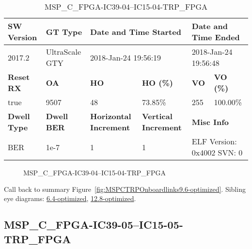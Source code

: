 \begin{table}[h]
\centering
\caption{MSP\_C\_FPGA-IC39-04--IC15-04-TRP\_FPGA}
\label{tab:MSPCFPGAIC3904IC1504TRPFPGA9.6-optimized}
\begin{tabular}{@{}|l|l|l|l|l|l|@{}}
\toprule
\textbf{SW Version}                & \textbf{GT Type}   & \multicolumn{2}{l|}{\textbf{Date and Time Started}}            & \multicolumn{2}{l|}{\textbf{Date and Time Ended}}        \\ \midrule
2017.2                       & UltraScale GTY          & \multicolumn{2}{l|}{2018-Jan-24 19:56:19}                   & \multicolumn{2}{l|}{2018-Jan-24 19:56:48}               \\ \midrule
\textbf{Reset RX}                  & \textbf{OA} & \textbf{HO}   & \textbf{HO (\%)} & \textbf{VO} & \textbf{VO (\%)} \\ \midrule
true & 9507        & 48          & 73.85\%        & 255        & 100.00\%       \\ \midrule
\textbf{Dwell Type}                & \textbf{Dwell BER} & \textbf{Horizontal Increment} & \textbf{Vertical Increment}    & \multicolumn{2}{l|}{\textbf{Misc Info}}                  \\ \midrule
BER                            & 1e-7        & 1        & 1           & \multicolumn{2}{l|}{ELF Version: 0x4002 SVN: 0}                         \\ \bottomrule
\end{tabular}
\end{table}

\begin{figure}[h]
\caption{MSP\_C\_FPGA-IC39-04--IC15-04-TRP\_FPGA} \label{fig:MSPCFPGAIC3904IC1504TRPFPGA9.6-optimized}
\end{figure}

Call back to summary Figure~\ref{fig:MSPCTRPOnboardlinks9.6-optimized}.
Sibling eye diagrams: \hyperref[sec:MSPCFPGAIC3904IC1504TRPFPGA6.4-optimized]{6.4-optimized}, \hyperref[sec:MSPCFPGAIC3904IC1504TRPFPGA12.8-optimized]{12.8-optimized}.

\clearpage
\newpage


\subsection{MSP\_C\_FPGA-IC39-05--IC15-05-TRP\_FPGA}\label{sec:MSPCFPGAIC3905IC1505TRPFPGA9.6-optimized}


